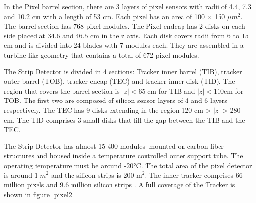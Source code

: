 In the Pixel barrel section, there are 3 layers of pixel sensors with radii of 4.4, 7.3 and 10.2 cm with a length of 53 cm. Each pixel has an area of 100 $\times$ 150 $\mu m^2$. The barrel section has 768 pixel modules.
The Pixel endcap has 2 disks on each side placed at 34.6 and 46.5 cm in the z axis. Each disk covers radii from 6 to 15 cm and is divided into 24 blades with 7 modules each.
They are assembled in a turbine-like geometry that contains a total of 672 pixel modules. %


The Strip Detector is divided in 4 sections: Tracker inner barrel (TIB), tracker outer barrel (TOB), tracker encap (TEC) and tracker inner disk (TID). The region that covers the barrel section is $|z|<65$ cm for TIB and $|z|<110$cm for TOB. The first two are composed of silicon sensor layers of 4 and 6 layers respectively. The TEC has 9 disks extending in the region 120 cm > $|z|$ > 280 cm. The 
TID comprises 3 small disks that fill the gap between the TIB and the TEC.


The Strip Detector has almost 15 400 modules, mounted on
carbon-fiber structures and housed inside a temperature controlled outer support tube. The operating temperature must be around -$\ang{20}$C. 
The total area of the pixel detector is around 1 $m^2$ and the silicon strips is 200 m$^2$. 
The inner tracker comprises 66 million pixels and 9.6
million silicon strips \cite{cms-manual}.
A full coverage of the Tracker is shown in figure \ref{pixel2}


